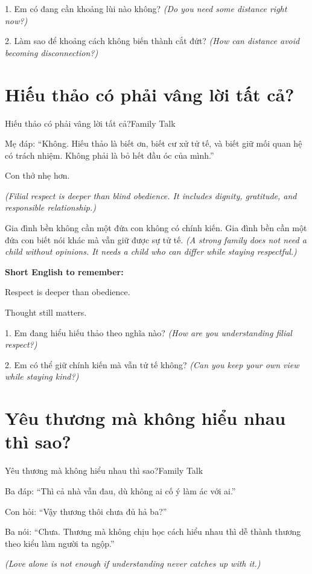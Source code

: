 \begin{tuhocnhanh}
1. Em có đang cần khoảng lùi nào không? \textit{(Do you need some distance right now?)}

2. Làm sao để khoảng cách không biến thành cắt đứt? \textit{(How can distance avoid becoming disconnection?)}
\end{tuhocnhanh}
\ngancach

\section{Hiếu thảo có phải vâng lời tất cả?}
\begin{truyen}{Hiếu thảo có phải vâng lời tất cả?}{Family Talk}

Mẹ đáp: ``Không. Hiếu thảo là biết ơn, biết cư xử tử tế, và biết giữ mối quan hệ có trách nhiệm. Không phải là bỏ hết đầu óc của mình.''

Con thở nhẹ hơn.

\textit{(Filial respect is deeper than blind obedience. It includes dignity, gratitude, and responsible relationship.)}
\end{truyen}

\begin{baihoc}
Gia đình bền không cần một đứa con không có chính kiến. Gia đình bền cần một đứa con biết nói khác mà vẫn giữ được sự tử tế.
\textit{(A strong family does not need a child without opinions. It needs a child who can differ while staying respectful.)}
\end{baihoc}

\begin{ghinhoanh}
\textbf{Short English to remember:}

Respect is deeper than obedience.

Thought still matters.
\end{ghinhoanh}

\begin{tuhocnhanh}
1. Em đang hiểu hiếu thảo theo nghĩa nào? \textit{(How are you understanding filial respect?)}

2. Em có thể giữ chính kiến mà vẫn tử tế không? \textit{(Can you keep your own view while staying kind?)}
\end{tuhocnhanh}
\ngancach

\section{Yêu thương mà không hiểu nhau thì sao?}
\begin{truyen}{Yêu thương mà không hiểu nhau thì sao?}{Family Talk}

Ba đáp: ``Thì cả nhà vẫn đau, dù không ai cố ý làm ác với ai.''

Con hỏi: ``Vậy thương thôi chưa đủ hả ba?''

Ba nói: ``Chưa. Thương mà không chịu học cách hiểu nhau thì dễ thành thương theo kiểu làm người ta ngộp.''

\textit{(Love alone is not enough if understanding never catches up with it.)}
\end{truyen}

